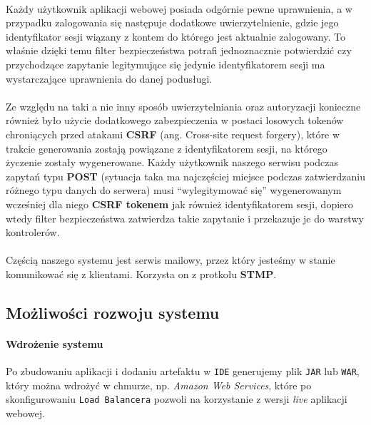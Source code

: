 \paragraph{}
Każdy użytkownik aplikacji webowej posiada odgórnie pewne uprawnienia, a w przypadku zalogowania się następuje dodatkowe uwierzytelnienie, gdzie jego identyfikator sesji wiązany z kontem do którego jest aktualnie zalogowany. To właśnie dzięki temu filter bezpieczeństwa potrafi jednoznacznie potwierdzić czy przychodzące zapytanie legitymujące się jedynie identyfikatorem sesji ma wystarczające uprawnienia do danej podusługi.

\paragraph{}
Ze względu na taki a nie inny sposób uwierzytelniania oraz autoryzacji konieczne również było użycie dodatkowego zabezpieczenia w postaci losowych tokenów chroniących przed atakami \textbf{CSRF} (ang. Cross-site request forgery), które w trakcie generowania zostają powiązane z identyfikatorem sesji, na którego życzenie zostały wygenerowane. Każdy użytkownik naszego serwisu podczas zapytań typu \textbf{POST} (sytuacja taka ma najczęściej miejsce podczas zatwierdzaniu różnego typu danych do serwera) musi ``wylegitymować się'' wygenerowanym wcześniej dla niego \textbf{CSRF tokenem} jak również identyfikatorem sesji, dopiero wtedy filter bezpieczeństwa zatwierdza takie zapytanie i przekazuje je do warstwy kontrolerów.

\paragraph{}
Częścią naszego systemu jest serwis mailowy, przez który jesteśmy w stanie komunikować się z klientami. Korzysta on z protkołu \textbf{STMP}.

\subsection{Możliwości rozwoju systemu}
\paragraph{Wdrożenie systemu}
Po zbudowaniu aplikacji i dodaniu artefaktu w \texttt{IDE} generujemy plik \texttt{JAR} lub \texttt{WAR}, który można wdrożyć w chmurze, np. \textit{Amazon Web Services}, które po skonfigurowaniu \texttt{Load Balancera} pozwoli na korzystanie z wersji \textit{live} aplikacji webowej.


